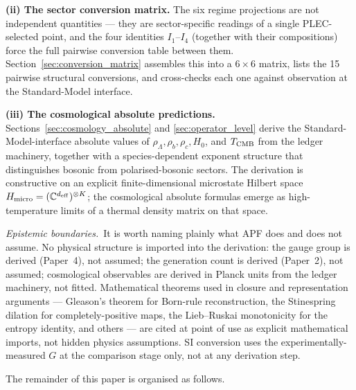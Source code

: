 \documentclass[11pt]{article}
\begin{document}
\smallskip
\noindent\textbf{(ii) The sector conversion matrix.} The six regime projections are not independent quantities --- they are sector-specific readings of a single PLEC-selected point, and the four identities $I_1$--$I_4$ (together with their compositions) force the full pairwise conversion table between them. Section~\ref{sec:conversion_matrix} assembles this into a $6 \times 6$ matrix, lists the 15 pairwise structural conversions, and cross-checks each one against observation at the Standard-Model interface.

\smallskip
\noindent\textbf{(iii) The cosmological absolute predictions.} Sections~\ref{sec:cosmology_absolute} and \ref{sec:operator_level} derive the Standard-Model-interface absolute values of $\rho_\Lambda, \rho_b, \rho_c, H_0$, and $T_{\rm CMB}$ from the ledger machinery, together with a species-dependent exponent structure that distinguishes bosonic from polarised-bosonic sectors. The derivation is constructive on an explicit finite-dimensional microstate Hilbert space $H_{\rm micro} = (\mathbb{C}^{d_{\rm eff}})^{\otimes K}$; the cosmological absolute formulas emerge as high-temperature limits of a thermal density matrix on that space.

\smallskip
\textit{Epistemic boundaries.}\ It is worth naming plainly what APF does and does not assume. No physical structure is imported into the derivation: the gauge group is derived (Paper~4), not assumed; the generation count is derived (Paper~2), not assumed; cosmological observables are derived in Planck units from the ledger machinery, not fitted. Mathematical theorems used in closure and representation arguments --- Gleason's theorem for Born-rule reconstruction, the Stinespring dilation for completely-positive maps, the Lieb--Ruskai monotonicity for the entropy identity, and others --- are cited at point of use as explicit mathematical imports, not hidden physics assumptions. SI conversion uses the experimentally-measured $G$ at the comparison stage only, not at any derivation step.

\smallskip

The remainder of this paper is organised as follows.
\end{document}
